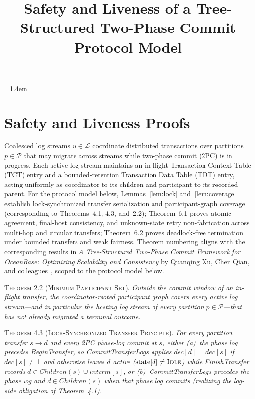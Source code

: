 \documentclass[sigconf,nonacm]{acmart}
\title{Safety and Liveness of a Tree-Structured Two-Phase Commit Protocol Model}
\newcommand{\stIdle}{\textsc{Idle}}
\newcommand{\Children}{\mathit{Children}}
\newcommand{\interm}{\mathit{interm}}
\newcommand{\dec}{\mathit{dec}}
\begin{document}
\maketitle
{}
\pagestyle{plain}
\thispagestyle{plain}
\raggedbottom
\emergencystretch=1.4em
\appendix
\section{Safety and Liveness Proofs}

Coalesced log streams \(u \in \mathcal{L}\) coordinate distributed
transactions over partitions \(p \in \mathcal{P}\) that may migrate across
streams while two-phase commit (2PC) is in progress. Each active log stream
maintains an in-flight Transaction Context Table (\(\mathrm{TCT}\)) entry
and a bounded-retention Transaction Data Table (\(\mathrm{TDT}\)) entry,
acting uniformly as coordinator to its children and participant to its
recorded parent. For the protocol model below, Lemmas~\ref{lem:lock}
and~\ref{lem:coverage} establish lock-synchronized transfer serialization and
participant-graph coverage (corresponding to Theorems~4.1, 4.3, and~2.2);
Theorem~6.1 proves atomic agreement, final-host consistency, and
unknown-state retry non-fabrication across multi-hop and circular
transfers; Theorem~6.2 proves deadlock-free termination under bounded
transfers and weak fairness. Theorem numbering aligns with the corresponding
results in \emph{A Tree-Structured Two-Phase Commit Framework for OceanBase:
Optimizing Scalability and Consistency} by Quanqing Xu, Chen Qian, and
colleagues~\cite{tree2pc}, scoped to the protocol model below.

\noindent\textsc{Theorem 2.2 (Minimum Participant Set).}
\emph{Outside the commit window of an in-flight transfer, the
coordinator-rooted participant graph covers every active log stream---and in
particular the hosting log stream of every partition \(p \in \mathcal{P}\)---that
has not already migrated a terminal outcome.}

\noindent\textsc{Theorem 4.3 (Lock-Synchronized Transfer Principle).}
\emph{For every partition transfer \(s \to d\) and every 2PC phase-log
commit at \(s\), either (a)~the phase log precedes \emph{BeginTransfer}, so
\emph{CommitTransferLogs} applies \(\dec[d] = \dec[s]\) if \(\dec[s] \neq
\bot\) and otherwise leaves \(d\) active (\(\mathrm{state}[d] \neq \stIdle\))
while \emph{FinishTransfer} records \(d \in \Children(s) \cup \interm[s]\),
or (b)~\emph{CommitTransferLogs} precedes the phase log and \(d \in
\Children(s)\) when that phase log commits (realizing the log-side obligation
of Theorem~4.1).}
\end{document}
